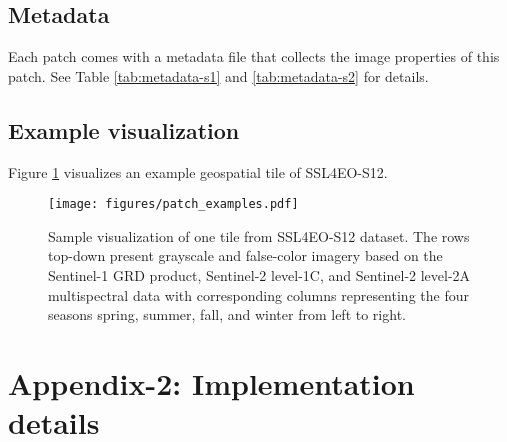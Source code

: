 \documentclass[lettersize,journal]{IEEEtran}
\begin{document}
\subsection{\textbf{Metadata}} Each patch comes with a metadata file that collects the image properties of this patch. See Table \ref{tab:metadata-s1} and \ref{tab:metadata-s2} for details.

\subsection{\textbf{Example visualization}} Figure \ref{fig:examples} visualizes an example geospatial tile of SSL4EO-S12.
\begin{figure}[h]
  \centering
  \texttt{[image: figures/patch\_examples.pdf]}
  \caption{Sample visualization of one tile from SSL4EO-S12 dataset. The rows top-down present grayscale and false-color imagery based on the Sentinel-1 GRD product, Sentinel-2 level-1C, and Sentinel-2 level-2A multispectral data with corresponding columns representing the four seasons spring, summer, fall, and winter from left to right.}
  \label{fig:examples}

\end{figure}



\begin{comment}
\textbf{Land cover distribution} We estimate the land cover distribution of the SSL4EO-S12 dataset by inferencing with a ResNet50 classifier fine-tuned on BigEarthNet (19 classes). We inference each patch's multi-label classes and report the estimated statistics in \cref{fig:ssl4eo-pred}.

\begin{figure}[h!]
    \centering
    \texttt{[image: figures/ssl4eo\_pred.pdf]}
    \caption{A rough estimation of SSL4EO-S12's land cover distribution.}
    \label{fig:ssl4eo-pred}
\end{figure}
\end{comment}




\clearpage


\section*{\large\textbf{Appendix-2: Implementation details}}
\vspace{1em}

\setcounter{subsection}{0}
\end{document}
